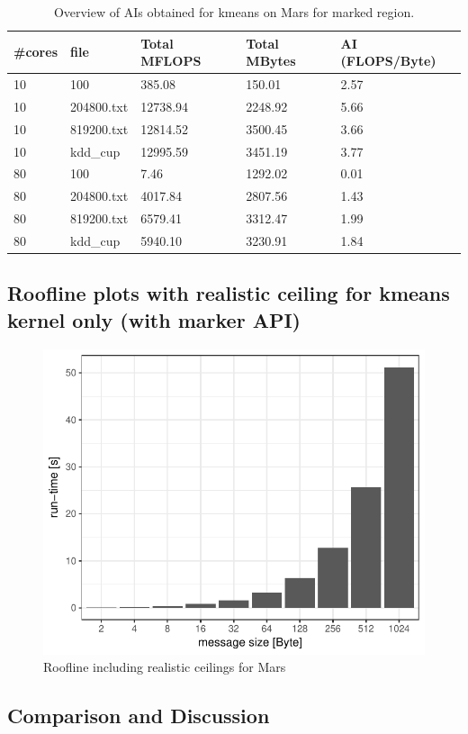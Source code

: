 \begin{table}[h]
\centering
\caption{\label{tab:ai_tab_marked}Overview of AIs obtained for kmeans on Mars for marked region.}
\begin{small}
\begin{tabular}{lllll}
\toprule
\#cores & file & Total MFLOPS & Total MBytes & AI (FLOPS/Byte) \\
\midrule
10 & 100 & 385.08 & 150.01 & 2.57 \\
10 & 204800.txt & 12738.94 & 2248.92 & 5.66 \\
10 & 819200.txt & 12814.52 & 3500.45 & 3.66 \\
10 & kdd\_cup & 12995.59 & 3451.19 & 3.77 \\
80 & 100 & 7.46 & 1292.02 & 0.01 \\
80 & 204800.txt & 4017.84 & 2807.56 & 1.43 \\
80 & 819200.txt & 6579.41 & 3312.47 & 1.99 \\
80 & kdd\_cup & 5940.10 & 3230.91 & 1.84 \\

\bottomrule
\end{tabular}
\end{small}
\end{table}

\subsection{Roofline plots with realistic ceiling for kmeans kernel only (with marker API)}

\begin{figure}[ht]
	\centering
	\includegraphics[width=.5\linewidth]{figures/runtime}
	\caption{Roofline including realistic ceilings for Mars}
	\label{fig:runtimex}
\end{figure}


\subsection{Comparison and Discussion}

